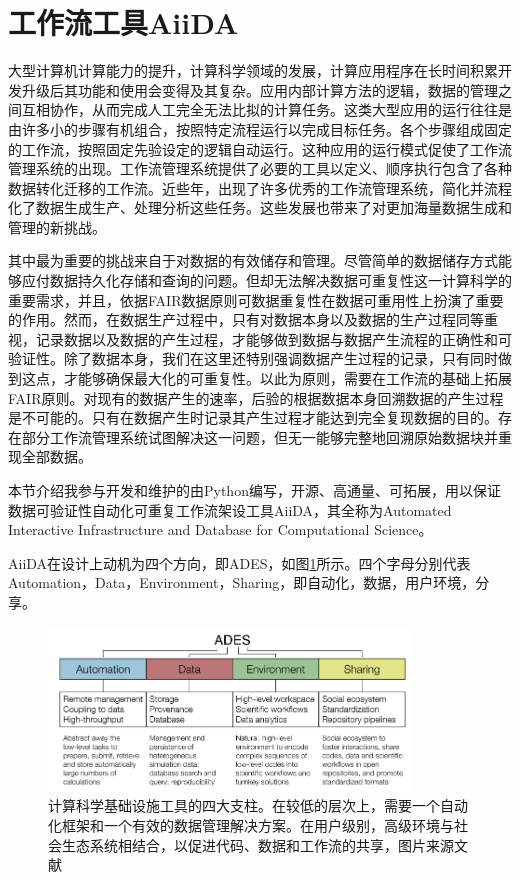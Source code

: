 \section{工作流工具AiiDA}
大型计算机计算能力的提升，计算科学领域的发展，计算应用程序在长时间积累开发升级后其功能和使用会变得及其复杂。应用内部计算方法的逻辑，数据的管理之间互相协作，从而完成人工完全无法比拟的计算任务。这类大型应用的运行往往是由许多小的步骤有机组合，按照特定流程运行以完成目标任务。各个步骤组成固定的工作流，按照固定先验设定的逻辑自动运行。这种应用的运行模式促使了工作流管理系统的出现。工作流管理系统提供了必要的工具以定义、顺序执行包含了各种数据转化迁移的工作流。近些年，出现了许多优秀的工作流管理系统，简化并流程化了数据生成生产、处理分析这些任务。这些发展也带来了对更加海量数据生成和管理的新挑战。

其中最为重要的挑战来自于对数据的有效储存和管理。尽管简单的数据储存方式能够应付数据持久化存储和查询的问题。但却无法解决数据可重复性这一计算科学的重要需求，并且，依据FAIR数据原则\cite{wilkinson2016fair}可数据重复性在数据可重用性上扮演了重要的作用。然而，在数据生产过程中，只有对数据本身以及数据的生产过程同等重视，记录数据以及数据的产生过程，才能够做到数据与数据产生流程的正确性和可验证性\cite{ioannidis2009repeatability,peng2011reproducible,stoddart2016there,allison2016reproducibility}。除了数据本身，我们在这里还特别强调数据产生过程的记录，只有同时做到这点，才能够确保最大化的可重复性。以此为原则，需要在工作流的基础上拓展FAIR原则。对现有的数据产生的速率，后验的根据数据本身回溯数据的产生过程是不可能的。只有在数据产生时记录其产生过程才能达到完全复现数据的目的。存在部分工作流管理系统试图解决这一问题，但无一能够完整地回溯原始数据块并重现全部数据。

本节介绍我参与开发和维护的由Python编写，开源、高通量、可拓展，用以保证数据可验证性自动化可重复工作流架设工具AiiDA\cite{pizzi2016aiida,huber2020aiida}，其全称为Automated Interactive Infrastructure and Database for Computational Science。

AiiDA在设计上动机为四个方向，即ADES，如图\ref{fig:ch3_ades}所示。四个字母分别代表Automation，Data，Environment，Sharing，即自动化，数据，用户环境，分享。

\begin{figure}
  \includegraphics[width=0.86\textwidth]{figs/ch3_ades.png}
  \centering
  \caption{计算科学基础设施工具的四大支柱。在较低的层次上，需要一个自动化框架和一个有效的数据管理解决方案。在用户级别，高级环境与社会生态系统相结合，以促进代码、数据和工作流的共享，图片来源文献\cite{pizzi2016aiida}}
  \label{fig:ch3_ades}
\end{figure}


